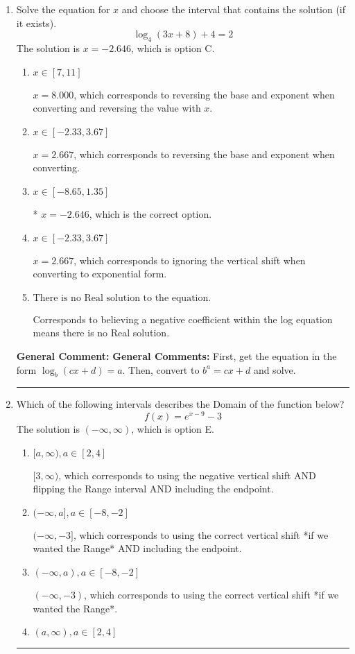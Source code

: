 \documentclass{extbook}[14pt]
\newcommand{\litem}[1]{\item #1

\rule{\textwidth}{0.4pt}}
\begin{document}
\begin{enumerate}\litem{
Solve the equation for $x$ and choose the interval that contains the solution (if it exists).
\[ \log_{4}{(3x+8)}+4 = 2 \]The solution is \( x = -2.646 \), which is option C.\begin{enumerate}[label=\Alph*.]
\item \( x \in [7, 11] \)

$x = 8.000$, which corresponds to reversing the base and exponent when converting and reversing the value with $x$.
\item \( x \in [-2.33, 3.67] \)

$x = 2.667$, which corresponds to reversing the base and exponent when converting.
\item \( x \in [-8.65, 1.35] \)

* $x = -2.646$, which is the correct option.
\item \( x \in [-2.33, 3.67] \)

$x = 2.667$, which corresponds to ignoring the vertical shift when converting to exponential form.
\item \( \text{There is no Real solution to the equation.} \)

Corresponds to believing a negative coefficient within the log equation means there is no Real solution.
\end{enumerate}

\textbf{General Comment:} \textbf{General Comments:} First, get the equation in the form $\log_b{(cx+d)} = a$. Then, convert to $b^a = cx+d$ and solve.
}
\litem{
Which of the following intervals describes the Domain of the function below?
\[ f(x) = e^{x-9}-3 \]The solution is \( (-\infty, \infty) \), which is option E.\begin{enumerate}[label=\Alph*.]
\item \( [a, \infty), a \in [2, 4] \)

$[3, \infty)$, which corresponds to using the negative vertical shift AND flipping the Range interval AND including the endpoint.
\item \( (-\infty, a], a \in [-8, -2] \)

$(-\infty, -3]$, which corresponds to using the correct vertical shift *if we wanted the Range* AND including the endpoint.
\item \( (-\infty, a), a \in [-8, -2] \)

$(-\infty, -3)$, which corresponds to using the correct vertical shift *if we wanted the Range*.
\item \( (a, \infty), a \in [2, 4] \)


\end{enumerate}}
\end{enumerate}
\end{document}

